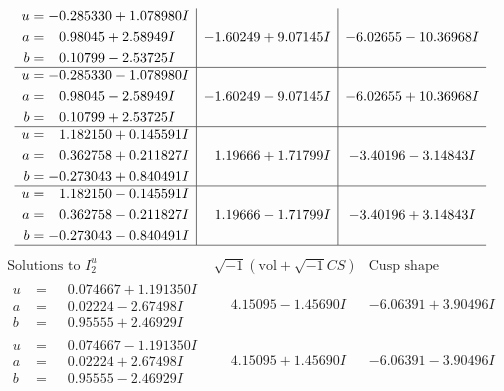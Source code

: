 \documentclass[1p]{elsarticle_modified}
\theoremstyle{definition}
\newcommand{\I}{\sqrt{-1}}
\begin{document}
$$\begin{array}{c|c|c}
\begin{aligned}
u &= -0.285330 + 1.078980 I \\
a &= \phantom{-}0.98045 + 2.58949 I \\
b &= \phantom{-}0.10799 - 2.53725 I\end{aligned}
 & -1.60249 + 9.07145 I & -6.02655 - 10.36968 I \\ \hline\begin{aligned}
u &= -0.285330 - 1.078980 I \\
a &= \phantom{-}0.98045 - 2.58949 I \\
b &= \phantom{-}0.10799 + 2.53725 I\end{aligned}
 & -1.60249 - 9.07145 I & -6.02655 + 10.36968 I \\ \hline\begin{aligned}
u &= \phantom{-}1.182150 + 0.145591 I \\
a &= \phantom{-}0.362758 + 0.211827 I \\
b &= -0.273043 + 0.840491 I\end{aligned}
 & \phantom{-}1.19666 + 1.71799 I & -3.40196 - 3.14843 I \\ \hline\begin{aligned}
u &= \phantom{-}1.182150 - 0.145591 I \\
a &= \phantom{-}0.362758 - 0.211827 I \\
b &= -0.273043 - 0.840491 I\end{aligned}
 & \phantom{-}1.19666 - 1.71799 I & -3.40196 + 3.14843 I\\
 \hline 
 \end{array}$$\newpage$$\begin{array}{c|c|c}  
\text{Solutions to }I^u_{2}& \I (\text{vol} + \sqrt{-1}CS) & \text{Cusp shape}\\
 \hline 
\begin{aligned}
u &= \phantom{-}0.074667 + 1.191350 I \\
a &= \phantom{-}0.02224 - 2.67498 I \\
b &= \phantom{-}0.95555 + 2.46929 I\end{aligned}
 & \phantom{-}4.15095 - 1.45690 I & -6.06391 + 3.90496 I \\ \hline\begin{aligned}
u &= \phantom{-}0.074667 - 1.191350 I \\
a &= \phantom{-}0.02224 + 2.67498 I \\
b &= \phantom{-}0.95555 - 2.46929 I\end{aligned}
 & \phantom{-}4.15095 + 1.45690 I & -6.06391 - 3.90496 I \\ \hline\begin{aligned}

\end{aligned}
\end{array}$$
\end{document}
